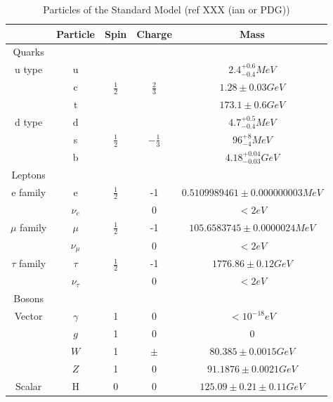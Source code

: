 \begin{table}[h]
\begin{center}
\footnotesize
\begin{tabular}[h]{|c||c|c|c|c|}
\hline
 & Particle & Spin & Charge & Mass \\
\hline\hline
Quarks &&&&\\
\hline
u type &u& & &${2.4^{+0.6}_{-0.4} MeV}$\\
 &c&${\frac{1}{2}}$&${\frac{2}{3}}$&${1.28\pm{0.03} GeV}$\\
 &t& & &${173.1\pm{0.6} GeV}$\\
\hline
d type & d& & & ${4.7^{+0.5}_{-0.4} MeV}$\\
 & s & ${\frac{1}{2}}$ & ${-\frac{1}{3}}$ & ${96^{+8}_{-4} MeV}$\\
 & b & & & ${4.18^{+0.04}_{-0.03} GeV}$\\
\hline\hline
Leptons &&&&\\
\hline
e family & e & ${\frac{1}{2}}$ & -1 &${0.5109989461\pm{}0.000000003 MeV}$\\
 & ${\nu_{e}}$ & & 0 & ${< 2 eV}$\\
 \hline
${\mu}$ family & ${\mu}$ & ${\frac{1}{2}}$ & -1 &${105.6583745\pm{}0.0000024 MeV}$\\
 & ${\nu_{\mu}}$ & & 0 & ${< 2 eV}$\\
 \hline
${\tau}$ family & ${\tau}$ & ${\frac{1}{2}}$ & -1 &${1776.86\pm{}0.12 GeV}$\\
 & ${\nu_{\tau}}$ & & 0 & ${< 2 eV}$\\
 \hline\hline
 Bosons &&&&\\
 \hline
 Vector & ${\gamma}$ & 1 & 0 & ${< 10^{-18} eV}$\\
 & ${g}$ & 1 & 0 & ${0}$\\
 & ${W}$ & 1 & ${\pm}$ & ${80.385\pm{}0.0015 GeV}$\\
 & ${Z}$ & 1 & 0 & ${91.1876\pm{}0.0021 GeV}$\\
 \hline
 Scalar & H & 0& 0 & ${125.09\pm{}0.21\pm{}0.11 GeV}$\\
 \hline
\end{tabular}
\caption{Particles of the Standard Model (ref XXX (ian or PDG))}
\label{tab:SM}
\end{center}
\end{table}

